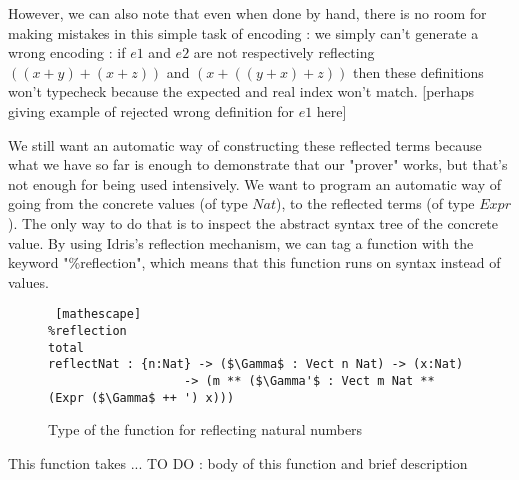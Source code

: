 However, we can also note that even when done by hand, there is no room for making mistakes in this simple task of encoding : we simply can't generate a wrong encoding : if $e1$ and $e2$ are not respectively reflecting $((x+y) + (x+z))$ and $(x + ((y + x) + z))$ then these definitions won't typecheck because the expected and real index won't match. [perhaps giving example of rejected wrong definition for $e1$ here]

We still want an automatic way of constructing these reflected terms because what we have so far is enough to demonstrate that our "prover" works, but that's not enough for being used intensively. We want to program an automatic way of going from the concrete values (of type $Nat$), to the reflected terms (of type $Expr$). The only way to do that is to inspect the abstract syntax tree of the concrete value.
By using Idris's reflection mechanism, we can tag a function with the keyword "\%reflection", which means that this function runs on syntax instead of values. 

\begin{figure}[H]
\figrule
\begin{center}
\begin{lstlisting} [mathescape]
%reflection
total
reflectNat : {n:Nat} -> ($\Gamma$ : Vect n Nat) -> (x:Nat) 
                   -> (m ** ($\Gamma'$ : Vect m Nat ** (Expr ($\Gamma$ ++ ') x)))
\end{lstlisting}
\end{center}
\caption{Type of the function for reflecting natural numbers}
\figrule
\end{figure}

This function takes ...
TO DO : body of this function and brief description





